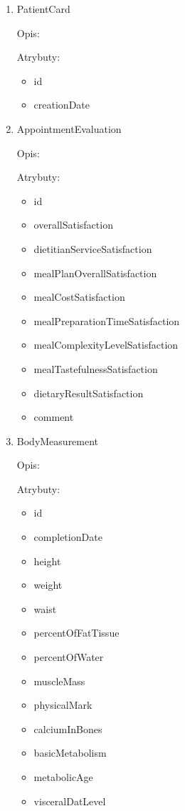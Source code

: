 \begin{enumerate}[label={\textbf{KAT/\protect\threedigits{\theenumi}}}, wide, labelwidth=!, labelindent=0pt]
    \item \label{kat:PatientCard} PatientCard

    Opis: \lipsum[1]
    \par
    Atrybuty:
    \begin{itemize}
        \item id
        \item creationDate
    \end{itemize}

    \item \label{kat:AppointmentEvaluation} AppointmentEvaluation

    Opis: \lipsum[1]
    \par
    Atrybuty:
    \begin{itemize}
        \item id
        \item overallSatisfaction
        \item dietitianServiceSatisfaction
        \item mealPlanOverallSatisfaction
        \item mealCostSatisfaction
        \item mealPreparationTimeSatisfaction
        \item mealComplexityLevelSatisfaction
        \item mealTastefulnessSatisfaction
        \item dietaryResultSatisfaction
        \item comment
    \end{itemize}

    \item \label{kat:BodyMeasurement} BodyMeasurement

    Opis: \lipsum[1]
    \par
    Atrybuty:
    \begin{itemize}
        \item id
        \item completionDate
        \item height
        \item weight
        \item waist
        \item percentOfFatTissue
        \item percentOfWater
        \item muscleMass
        \item physicalMark
        \item calciumInBones
        \item basicMetabolism
        \item metabolicAge
        \item visceralDatLevel
    \end{itemize}


\end{enumerate}
